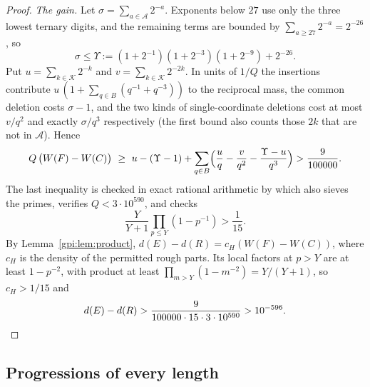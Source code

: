 \begin{proof}
\emph{The gain.} Let $\sigma=\sum_{a\in\mathcal A}2^{-a}$. Exponents below $27$ use only the
three lowest ternary digits, and the remaining terms are bounded by
$\sum_{a\ge27}2^{-a}=2^{-26}$, so
\[
 \sigma\le\Upsilon:=(1+2^{-1})(1+2^{-3})(1+2^{-9})+2^{-26}.
\]
Put $u=\sum_{k\in\mathcal K}2^{-k}$ and $v=\sum_{k\in\mathcal K}2^{-2k}$. In units of $1/Q$
the insertions contribute $u\,(1+\sum_{q\in B}(q^{-1}+q^{-3}))$ to the reciprocal mass, the
common deletion costs $\sigma-1$, and the two kinds of single-coordinate deletions cost at
most $v/q^2$ and exactly $\sigma/q^3$ respectively (the first bound also counts those $2k$
that are not in $\mathcal A$). Hence
\[
 Q\,\bigl(W(F)-W(C)\bigr)\ \ge\ u-(\Upsilon-1)
 +\sum_{q\in B}\Bigl(\frac uq-\frac v{q^2}-\frac{\Upsilon-u}{q^3}\Bigr)>\frac9{100000}.
\]
The last inequality is checked in exact rational arithmetic by
which also
sieves the primes, verifies $Q<3\cdot10^{590}$, and checks
\[
 \frac Y{Y+1}\prod_{p\le Y}(1-p^{-1})>\frac1{15}.
\]
By Lemma~\ref{gpi:lem:product}, $d(E)-d(R)=c_H(W(F)-W(C))$, where $c_H$ is the density of the
permitted rough parts. Its local factors at $p>Y$ are at least $1-p^{-2}$, with product at
least $\prod_{m>Y}(1-m^{-2})=Y/(Y+1)$, so $c_H>1/15$ and
\[
 d(E)-d(R)>\frac9{100000\cdot15\cdot3\cdot10^{590}}>10^{-596}. \qedhere
\]
\end{proof}

\subsection{Progressions of every length}\label{gpi:sec:klength}
{\raggedright{}}

